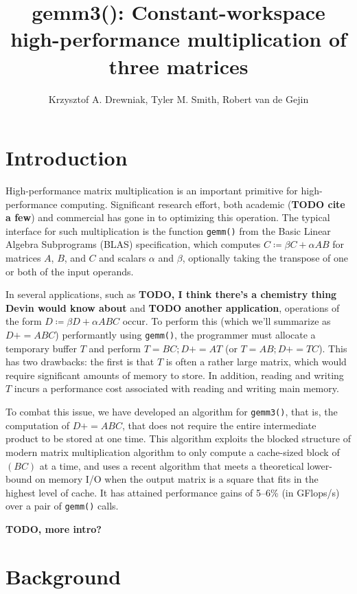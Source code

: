 \documentclass[12pt]{article}
\title{gemm3(): Constant-workspace high-performance multiplication of three matrices}
\author{Krzysztof A. Drewniak, Tyler M. Smith, Robert van de Gejin}
\newcommand{\pluseq}{\mathrel{{+}{=}}}
\newcommand{\gemmt}{{\texttt{gemm3()}}}
\newcommand{\gemm}{{\texttt{gemm()}}}
\begin{document}
\maketitle{}
\section{Introduction}
High-performance matrix multiplication is an important primitive for high-performance computing.
Significant research effort, both academic (\textbf{TODO cite a few}) and commercial has gone in to optimizing this operation.
The typical interface for such multiplication is the function \gemm{} from the Basic Linear Algebra Subprograms (BLAS) specification, which computes $C \coloneqq \beta C + \alpha AB$ for matrices $A$, $B$, and $C$ and scalars $\alpha$ and $\beta$, optionally taking the transpose of one or both of the input operands.

In several applications, such as \textbf{TODO, I think there's a chemistry thing Devin would know about} and \textbf{TODO another application}, operations of the form $D \coloneqq \beta D + \alpha ABC$ occur.
To perform this (which we'll summarize as $D \pluseq ABC$) performantly using \gemm{}, the programmer must allocate a temporary buffer $T$ and perform $T = BC; D \pluseq AT$ (or $T = AB; D \pluseq TC$).
This has two drawbacks: the first is that $T$ is often a rather large matrix, which would require significant amounts of memory to store.
In addition, reading and writing $T$ incurs a performance cost associated with reading and writing main memory.

To combat this issue, we have developed an algorithm for \gemmt{}, that is, the computation of $D \pluseq ABC$, that does not require the entire intermediate product to be stored at one time.
This algorithm exploits the blocked structure of modern matrix multiplication algorithm to only compute a cache-sized block of $(BC)$ at a time, and uses a recent algorithm that meets a theoretical lower-bound on memory I/O when the output matrix is a square that fits in the highest level of cache.
It has attained performance gains of 5--6\% (in GFlops/s) over a pair of \gemm{} calls.

\textbf{TODO, more intro?}
\section{Background}
\end{document}
